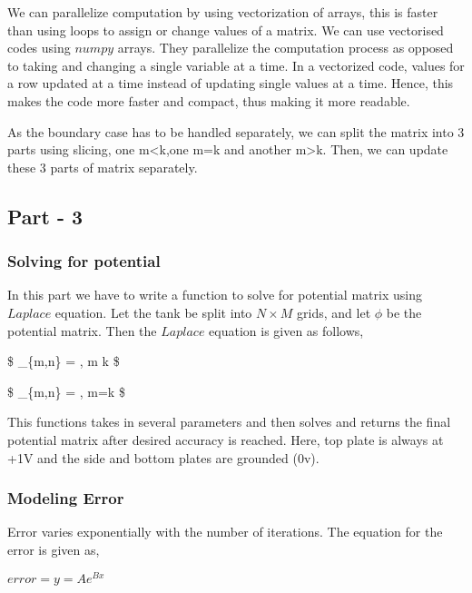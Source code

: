 \documentclass[11pt]{article}
\begin{document}
We can parallelize computation by using vectorization of arrays, this is
faster than using loops to assign or change values of a matrix. We can
use vectorised codes using \(numpy\) arrays. They parallelize the
computation process as opposed to taking and changing a single variable
at a time. In a vectorized code, values for a row updated at a time
instead of updating single values at a time. Hence, this makes the code
more faster and compact, thus making it more readable.

As the boundary case has to be handled separately, we can split the
matrix into 3 parts using slicing, one m\textless{}k,one m=k and another
m\textgreater{}k. Then, we can update these 3 parts of matrix
separately.

    \hypertarget{part---3}{%
\subsection{Part - 3}\label{part---3}}

\hypertarget{solving-for-potential}{%
\subsubsection{Solving for potential}\label{solving-for-potential}}

In this part we have to write a function to solve for potential matrix
using \(Laplace\) equation. Let the tank be split into \(N\times M\)
grids, and let \(\phi\) be the potential matrix. Then the \(Laplace\)
equation is given as follows,

\$ \phi\_\{m,n\} =
 , m \neq k
\$

\$ \phi\_\{m,n\} =
 , m=k \$

This functions takes in several parameters and then solves and returns
the final potential matrix after desired accuracy is reached. Here, top
plate is always at +1V and the side and bottom plates are grounded (0v).

\hypertarget{modeling-error}{%
\subsubsection{Modeling Error}\label{modeling-error}}

Error varies exponentially with the number of iterations. The equation
for the error is given as,

\(error = y = A e^{Bx}\)
\end{document}
